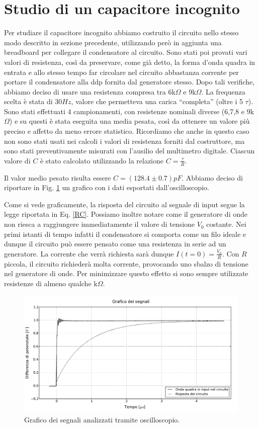 \section{Studio di un capacitore incognito}
Per studiare il capacitore incognito abbiamo costruito il circuito nello stesso modo descritto in sezione precedente, utilizzando però in aggiunta una breadboard per collegare il condensatore al circuito. Sono stati poi provati vari valori di resistenza, così da preservare, come già detto, la forma d'onda quadra in entrata e allo stesso tempo far circolare nel circuito abbastanza corrente per portare il condensatore alla ddp fornita dal generatore stesso. Dopo tali verifiche, abbiamo deciso di usare una resistenza compresa tra $6$k$\Omega$ e $9$k$\Omega$. La frequenza scelta è stata di $30Hz$, valore che permetteva una carica ``completa'' (oltre i 5 $\tau$). Sono stati effettuati 4 campionamenti, con resistenze nominali diverse (6,7,8 e 9k$\Omega$) e su questi è stata eseguita una media pesata, così da ottenere un valore più preciso e affetto da meno errore statistico.
Ricordiamo che anche in questo caso non sono stati usati nei calcoli i valori di resistenza forniti dal costruttore, ma sono stati preventivamente misurati con l'ausilio del multimetro digitale. Ciascun valore di $C$ è stato calcolato utilizzando la relazione $C=\frac{\tau}{R}$.

Il valor medio pesato risulta essere $C=(128.4\pm0.7) pF$. Abbiamo deciso di riportare in Fig. \ref{fig:1} un grafico con i dati esportati dall'oscilloscopio. 

Come si vede graficamente, la risposta del circuito al segnale di input segue la legge riportata in Eq. \ref{RC}. 
Possiamo inoltre notare come il generatore di onde non riesca a raggiungere immediatamente il valore di tensione $V_0$ costante. Nei primi istanti di tempo infatti il condensatore si comporta come un filo ideale e dunque il circuito può essere pensato come una resistenza in serie ad un generatore. La corrente che verrà richiesta sarà dunque $I(t=0)=\frac{V_0}{R}$. Con $R$ piccola, il circuito richiederà molta corrente, provocando uno sbalzo di tensione nel generatore di onde. Per minimizzare questo effetto si sono sempre utilizzate resistenze di almeno qualche k$\Omega$.
\begin{figure}[h!]
    \centering
        \includegraphics[width=0.8 \textwidth]{figure3.pdf}%
        \caption{Grafico dei segnali analizzati tramite oscilloscopio.}
        \label{fig:1}
\end{figure}